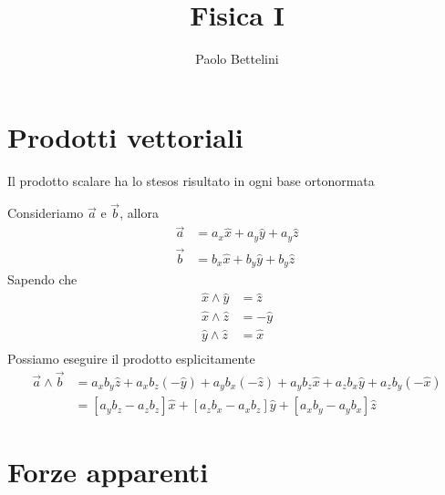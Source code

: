 \documentclass[a4paper]{article}
\title{Fisica I}
\author{Paolo Bettelini}
\date{}
\begin{document}
\maketitle
\tableofcontents

\pagebreak

\section{Prodotti vettoriali}

Il prodotto scalare ha lo stesos risultato in ogni base ortonormata


Consideriamo \(\vec{a}\) e \(\vec{b}\), allora
\begin{align*}
    \vec{a} &= a_x\hat{x} + a_y\hat{y} + a_y\hat{z} \\
    \vec{b} &= b_x\hat{x} + b_y\hat{y} + b_y\hat{z}
\end{align*}
Sapendo che
\begin{align*}
    \hat{x} \wedge \hat{y} &= \hat{z} \\ 
    \hat{x} \wedge \hat{z} &= -\hat{y} \\
    \hat{y} \wedge \hat{z} &= \hat{x} \\
\end{align*}
Possiamo eseguire il prodotto esplicitamente
\begin{align*}
    \vec{a} \wedge \vec{b} &= a_xb_y\hat{z} + a_xb_z(-\hat{y}) + a_yb_x(-\hat{z})
    + a_yb_z\hat{x} + a_zb_x\hat{y} + a_zb_y(-\hat{x}) \\
    &= \left[a_yb_z - a_zb_z\right] \hat{x} + \left[a_zb_x - a_xb_z\right]\hat{y}
    + \left[a_xb_y - a_yb_x\right] \hat{z}
\end{align*}

\section{Forze apparenti}
\end{document}
